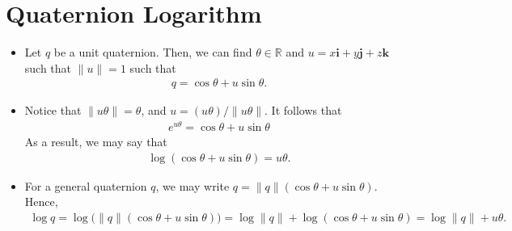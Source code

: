 \documentclass[10pt]{article}
\newcommand{\ve}[1]{\mathbf{#1}}
\newcommand{\Real}{\mathbb{R}}
\begin{document}
\section{Quaternion Logarithm}

\begin{itemize}
    \item Let $q$ be a unit quaternion. Then, we can find $\theta \in \Real$ and $u = x\ve{i} + y\ve{j} + z\ve{k}$ such that $\| u \| = 1$ such that
    \begin{align*}
        q = \cos\theta + u \sin\theta.
    \end{align*}

    \item Notice that $\| u\theta \| = \theta$, and $u = (u\theta)/\|u\theta\|$. It follows that
    \begin{align*}
        e^{u\theta} = \cos\theta + u \sin\theta
    \end{align*}
    As a result, we may say that
    \begin{align*}
        \log (\cos \theta + u \sin \theta) = u\theta.
    \end{align*}

    \item For a general quaternion $q$, we may write $q = \|q\| (\cos \theta + u \sin \theta)$. Hence,
    \begin{align*}
        \log q = \log \big( \|q\| (\cos \theta + u \sin \theta) \big) = \log \|q\| + \log (\cos \theta + u \sin \theta) = \log \|q\| + u\theta.
    \end{align*}
\end{itemize}



  
\end{document}
